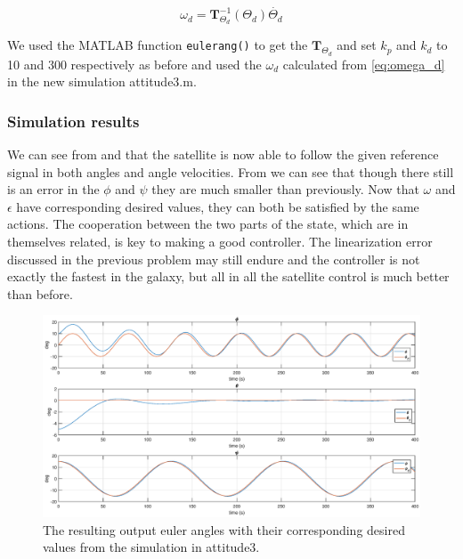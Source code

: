 \begin{equation}
    \omega_d = \mathbf{T}_{\Theta_d}^{-1}(\Theta_d)\dot{\Theta_d}
    \label{eq:omega_d}
\end{equation}

We used the MATLAB function \texttt{eulerang()} to get the $\mathbf{T}_{\Theta_d}$ and set $k_p$ and $k_d$ to 10 and 300 respectively as before and used the $\omega_d$ calculated from \eqref{eq:omega_d} in the new simulation {\color{blue} attitude3.m}.

\subsubsection*{Simulation results}

We can see from  and  that the satellite is now able to follow the given reference signal in both angles and angle velocities. From  we can see that though there still is an error in the $\phi$ and $\psi$ they are much smaller than previously. Now that $\omega$ and $\epsilon$ have corresponding desired values, they can both be satisfied by the same actions. The cooperation between the two parts of the state, which are in themselves related, is key to making a good controller. The linearization error discussed in the previous problem may still endure and the controller is not exactly the fastest in the galaxy, but all in all the satellite control is much better than before.

\begin{figure}
	\centering
	\includegraphics[width=1.00\textwidth]{figures/3_euler.eps}
	\caption{The resulting output euler angles with their corresponding desired values from the simulation in attitude3.}
\label{fig:sim_attitude3_euler}
\end{figure}

